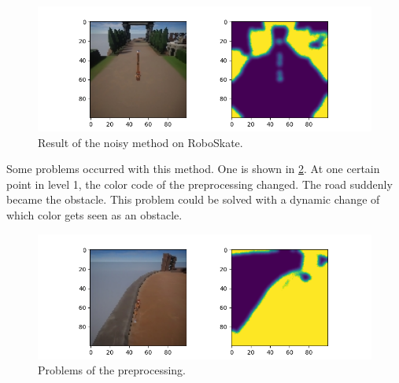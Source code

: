 \documentclass[conference]{IEEEtran}
\begin{document}



\begin{figure}[!t]
\centering
\includegraphics[width = 1.0\linewidth]{images/Preprocessing12.png}
\caption{Result of the noisy method on RoboSkate.}
\label{fig:NoisyRoboSkate}
\end{figure}



Some problems occurred with this method. One is shown in \figurename  \ref{fig:problemspreprocessing}. At one certain point in level 1, the color code of the preprocessing changed. The road suddenly became the obstacle. This problem could be solved with a dynamic change of which color gets seen as an obstacle.

\begin{figure}[!t]
\centering
\includegraphics[width = 1.0\linewidth]{images/Preprocessing14.png}
\caption{Problems of the preprocessing.}
\label{fig:problemspreprocessing}
\end{figure}
\end{document}
